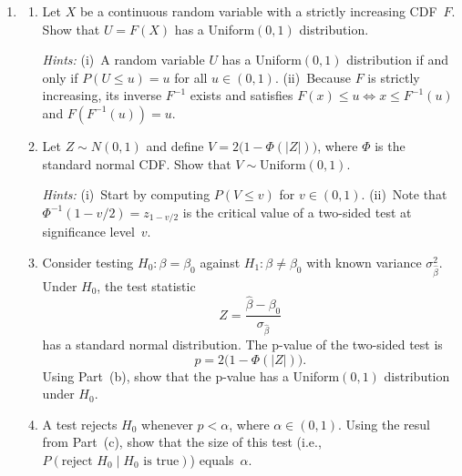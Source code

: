 \documentclass[12pt]{article}
\begin{document}
\begin{enumerate}
\item 

\begin{enumerate}
\item Let $X$ be a continuous random variable with a strictly
increasing CDF~$F$. Show that $U = F(X)$ has a Uniform$(0,1)$ distribution.

\textit{Hints:} (i)~A random variable $U$ has a Uniform$(0,1)$
distribution if and only if $P(U \le u) = u$ for all
$u \in (0,1)$.
(ii)~Because $F$ is strictly increasing, its inverse $F^{-1}$
exists and satisfies $F(x) \le u \iff x \le F^{-1}(u)$ and
$F(F^{-1}(u)) = u$.

\item Let $Z \sim N(0,1)$ and define
$V = 2\bigl(1 - \Phi(|Z|)\bigr)$, where $\Phi$ is the standard
normal CDF.  Show that $V \sim \text{Uniform}(0,1)$.

\textit{Hints:} (i)~Start by computing $P(V \le v)$ for
$v \in (0,1)$.
(ii)~Note that $\Phi^{-1}(1 - v/2) = z_{1-v/2}$ is the critical
value of a two-sided test at significance level~$v$.

\item Consider testing $H_0\colon \beta = \beta_0$ against
$H_1\colon \beta \ne \beta_0$ with known variance
$\sigma_{\hat{\beta}}^2$.  Under $H_0$, the test statistic
$$
Z = \frac{\hat{\beta} - \beta_0}{\sigma_{\hat{\beta}}}
$$
has a standard normal distribution. The p-value of the two-sided
test is
$$
p = 2\bigl(1 - \Phi(|Z|)\bigr).
$$
Using Part~(b), show that the p-value has a Uniform$(0,1)$
distribution under $H_0$.

\item A test rejects $H_0$ whenever $p < \alpha$, where $\alpha \in (0,1)$. Using the resul from Part~(c),
show that the size of this test (i.e.,
$P(\text{reject } H_0 \mid H_0 \text{ is true})$) equals~$\alpha$. 
\end{enumerate}

\end{enumerate}
\end{document}
